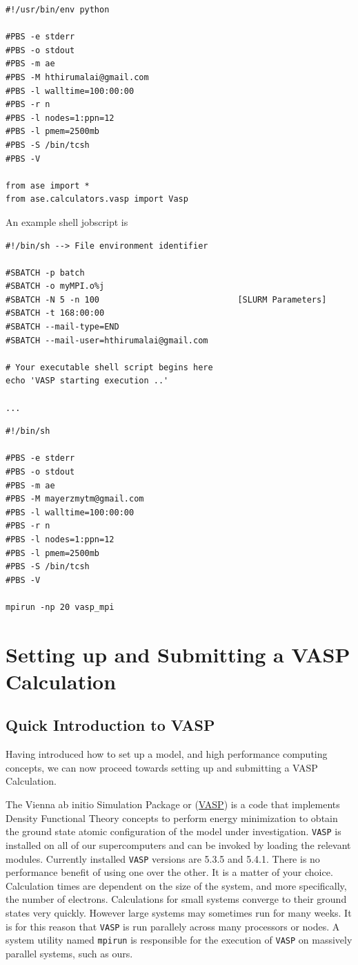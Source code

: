 \documentclass[11pt]{article}
\begin{document}
\begin{verbatim}
#!/usr/bin/env python

#PBS -e stderr
#PBS -o stdout
#PBS -m ae
#PBS -M hthirumalai@gmail.com
#PBS -l walltime=100:00:00
#PBS -r n
#PBS -l nodes=1:ppn=12
#PBS -l pmem=2500mb
#PBS -S /bin/tcsh
#PBS -V

from ase import *
from ase.calculators.vasp import Vasp
\end{verbatim}

An example shell jobscript is
\begin{verbatim}
#!/bin/sh --> File environment identifier

#SBATCH -p batch
#SBATCH -o myMPI.o%j
#SBATCH -N 5 -n 100                            [SLURM Parameters]
#SBATCH -t 168:00:00
#SBATCH --mail-type=END
#SBATCH --mail-user=hthirumalai@gmail.com

# Your executable shell script begins here
echo 'VASP starting execution ..'

...
\end{verbatim}

\begin{verbatim}
#!/bin/sh

#PBS -e stderr
#PBS -o stdout
#PBS -m ae
#PBS -M mayerzmytm@gmail.com
#PBS -l walltime=100:00:00
#PBS -r n
#PBS -l nodes=1:ppn=12
#PBS -l pmem=2500mb
#PBS -S /bin/tcsh
#PBS -V

mpirun -np 20 vasp_mpi
\end{verbatim}

\section{Setting up and Submitting a VASP Calculation}
\label{sec-4}
\subsection{Quick Introduction to VASP}
\label{sec-4-1}
Having introduced how to set up a model, and high performance computing concepts, we can now proceed towards setting up and submitting a VASP Calculation.

The Vienna ab initio Simulation Package or (\href{https://www.vasp.at/}{VASP}) is a code that implements Density Functional Theory concepts to perform energy minimization to obtain the ground state atomic configuration of the model under investigation. \texttt{VASP} is installed on all of our supercomputers and can be invoked by loading the relevant modules. Currently installed \texttt{VASP} versions are 5.3.5 and 5.4.1. There is no performance benefit of using one over the other. It is a matter of your choice. Calculation times are dependent on the size of the system, and more specifically, the number of electrons. Calculations for small systems converge to their ground states very quickly. However large systems may sometimes run for many weeks. It is for this reason that \texttt{VASP} is run parallely across many processors or nodes. A system utility named \texttt{mpirun} is responsible for the execution of \texttt{VASP} on massively parallel systems, such as ours.
\end{document}
